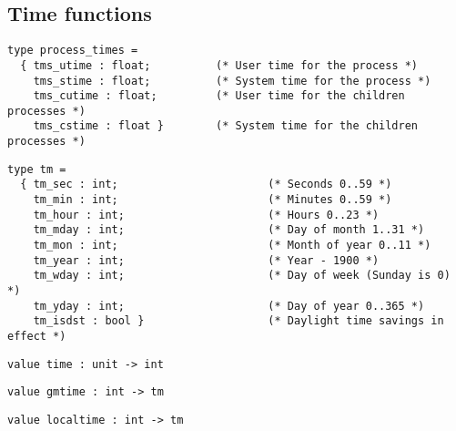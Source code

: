 \subsection*{Time functions }\begin{verbatim}
type process_times =
  { tms_utime : float;          (* User time for the process *)
    tms_stime : float;          (* System time for the process *)
    tms_cutime : float;         (* User time for the children processes *)
    tms_cstime : float }        (* System time for the children processes *)
\end{verbatim}
\begin{comment}
 The execution times (CPU times) of a process. 
\end{comment}
\begin{verbatim}
type tm =
  { tm_sec : int;                       (* Seconds 0..59 *)
    tm_min : int;                       (* Minutes 0..59 *)
    tm_hour : int;                      (* Hours 0..23 *)
    tm_mday : int;                      (* Day of month 1..31 *)
    tm_mon : int;                       (* Month of year 0..11 *)
    tm_year : int;                      (* Year - 1900 *)
    tm_wday : int;                      (* Day of week (Sunday is 0) *)
    tm_yday : int;                      (* Day of year 0..365 *)
    tm_isdst : bool }                   (* Daylight time savings in effect *)
\end{verbatim}
\begin{comment}
 The type representing wallclock time and calendar date. 
\end{comment}
\begin{verbatim}
value time : unit -> int
\end{verbatim}
%
\begin{comment}
 Return the current time since 00:00:00 GMT, Jan. 1, 1970,
           in seconds. 
\end{comment}
\begin{verbatim}
value gmtime : int -> tm
\end{verbatim}
%
\begin{comment}
 Convert a time in seconds, as returned by \verbtime, into a date and
           a time. Assumes Greenwich meridian time zone. 
\end{comment}
\begin{verbatim}
value localtime : int -> tm
\end{verbatim}
%
\begin{comment}
 Convert a time in seconds, as returned by \verbtime, into a date and
           a time. Assumes the local time zone. 
\end{comment}
